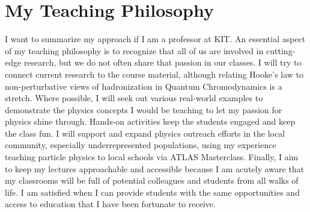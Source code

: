 \documentclass[10pt,a4paper,sans]{moderncv} %
\begin{document}
\section{My Teaching Philosophy}
I want to summarize my approach if I am a professor at KIT. An essential aspect of my teaching philosophy is to recognize that all of us are involved in cutting-edge research, but we do not often share that passion in our classes. I will try to connect current research to the course material, although relating Hooke's law to non-perturbative views of hadronization in Quantum Chromodynamics is a stretch. Where possible, I will seek out various real-world examples to demonstrate the physics concepts I would be teaching to let my passion for physics shine through. Hands-on activities keep the students engaged and keep the class fun. I will support and expand physics outreach efforts in the local community, especially underrepresented populations, using my experience teaching particle physics to local schools via ATLAS Masterclass. Finally, I aim to keep my lectures approachable and accessible because I am acutely aware that my classrooms will be full of potential colleagues and students from all walks of life. I am satisfied when I can provide students with the same opportunities and access to education that I have been fortunate to receive.

\printbibliography
\end{document}
